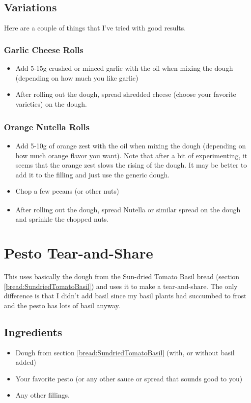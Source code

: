 \documentclass[10pt, openany]{book}
\begin{document}
\subsection{Variations}
Here are a couple of things that I've tried with good results.
\subsubsection{Garlic Cheese Rolls}
\begin{itemize}
  \item Add 5-15g crushed or minced garlic with the oil when mixing the dough (depending on how much you like garlic)
  \item After rolling out the dough, spread shredded cheese (choose your favorite varieties) on the dough.
\end{itemize}
\subsubsection{Orange Nutella\textsuperscript{\textregistered} Rolls}
\begin{itemize}
  \item Add 5-10g of orange zest with the oil when mixing the dough (depending on how much orange flavor you want).  Note that after a bit of experimenting, it seems that the orange zest slows the rising of the dough.  It may be better to add it to the filling and just use the generic dough.
  \item Chop a few pecans (or other nuts)
  \item After rolling out the dough, spread Nutella\textsuperscript{\textregistered} or similar spread on the dough and sprinkle the chopped nuts.
\end{itemize}

\section{Pesto Tear-and-Share}
This uses basically the dough from the Sun-dried Tomato Basil bread (section \ref{bread:SundriedTomatoBasil}) and uses it to make a tear-and-share.  The only difference is that I didn't add basil since my basil plants had succumbed to frost and the pesto has lots of basil anyway.
\subsection{Ingredients}
\begin{itemize}
  \item Dough from section \ref{bread:SundriedTomatoBasil} (with, or without basil added)
  \item Your favorite pesto (or any other sauce or spread that sounds good to you)
  \item Any other fillings.
\end{itemize}
\end{document}
